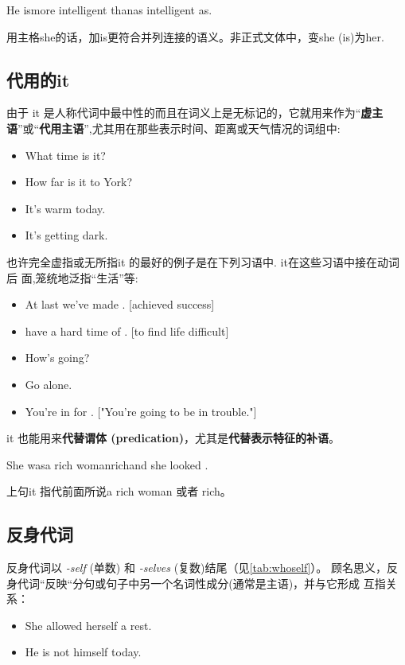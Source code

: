 \begin{sdbig4}{He is}{more intelligent than}{as intelligent as}{.}
\end{sdbig4}
用主格she的话，加is更符合并列连接的语义。非正式文体中，变she (is)为her.

\subsection{代用的it}

由于 it 是人称代词中最中性的而且在词义上是无标记的，它就用来作为“\textbf{虚主
  语}”或“\textbf{代用主语}”,尤其用在那些表示时间、距离或天气情况的词组中:
\begin{itemize}
\item What time is it?
\item How far is it to York?
\item It's warm today.
\item It's getting dark.
\end{itemize}

也许完全虚指或无所指it 的最好的例子是在下列习语中. it在这些习语中接在动词后
面,笼统地泛指“生活”等:
\begin{itemize}
\item At last we've made . [achieved success]
\item have a hard time of . [to find life difficult]
\item How's  going?
\item Go  alone.
\item You're in for . ["You're going to be in trouble."]
\end{itemize}

it 也能用来\textbf{代替谓体 (predication)}，尤其是\textbf{代替表示特征的补语}。
\begin{sdbig4}{She was}{a rich woman}{rich}{and she looked .}
\end{sdbig4}

上句it 指代前面所说a rich woman 或者 rich。

\subsection{反身代词}
反身代词以 \emph{-self} (单数) 和 \emph{-selves} (复数)结尾（见\cref{tab:whoself}）。
顾名思义，反身代词“反映“分句或句子中另一个名词性成分(通常是主语)，并与它形成
互指关系：
\begin{itemize}
\item She allowed herself a rest.
\item He is not himself today.
\end{itemize}

